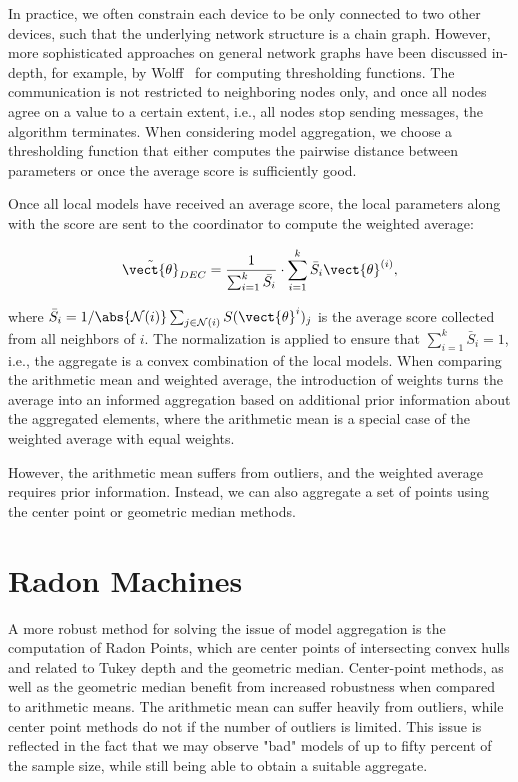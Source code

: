 

In practice, we often constrain each device to be only connected to two other devices, such that the underlying network structure is a chain graph.
However, more sophisticated approaches on general network graphs have been discussed in-depth, for example, by Wolff~\cite{wolff2013local} for computing thresholding functions.
The communication is not restricted to neighboring nodes only, and once all nodes agree on a value to a certain extent, i.e., all nodes stop sending messages, the algorithm terminates.
When considering model aggregation, we choose a thresholding function that either computes the pairwise distance between parameters or once the average score is sufficiently good.

Once all local models have received an average score, the local parameters along with the score are sent to the coordinator to compute the weighted average:

\begin{equation}
    \label{eq:scorenorm}
    \tilde{\vect{\theta}}_{DEC} = \frac{1}{\sum_{i=1}^k \bar{S_i}} \cdot \sum_{i=1}^k \bar{S}_i \vect{\theta}^{(i)},
\end{equation}

where $\bar{S}_i = 1/\abs{\mathcal{N}(i)}\sum_{j\in \mathcal{N}(i)} S(\vect{\theta}^i)_j$ is the average score collected from all neighbors of $i$. 
The normalization is applied to ensure that $\sum_{i=1}^k \bar{S}_i = 1$, i.e., the aggregate is a convex combination of the local models.
When comparing the arithmetic mean and weighted average, the introduction of weights turns the average into an informed aggregation based on additional prior information about the aggregated elements, where the arithmetic mean is a special case of the weighted average with equal weights.

However, the arithmetic mean suffers from outliers, and the weighted average requires prior information.
Instead, we can also aggregate a set of points using the center point or geometric median methods.

\section{Radon Machines}
\label{ssec:radon}
A more robust method for solving the issue of model aggregation is the computation of Radon Points, which are center points of intersecting convex hulls and related to Tukey depth and the geometric median. 
Center-point methods, as well as the geometric median benefit from increased robustness when compared to arithmetic means.
The arithmetic mean can suffer heavily from outliers, while center point methods do not if the number of outliers is limited.
This issue is reflected in the fact that we may observe "bad" models of up to fifty percent of the sample size, while still being able to obtain a suitable aggregate.

